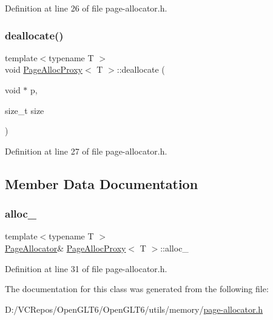 Definition at line 26 of file page-\/allocator.\+h.

\mbox{\label{class_page_alloc_proxy_aae141951053a3d3a4288b9a8cd548514}} 
\subsubsection{\texorpdfstring{deallocate()}{deallocate()}}
{\footnotesize\ttfamily template$<$typename T $>$ \\
void \mbox{\hyperlink{class_page_alloc_proxy}{Page\+Alloc\+Proxy}}$<$ T $>$\+::deallocate (\begin{DoxyParamCaption}\item[{void $\ast$}]{p,  }\item[{size\+\_\+t}]{size }\end{DoxyParamCaption})\hspace{0.3cm}{\ttfamily [inline]}}



Definition at line 27 of file page-\/allocator.\+h.



\subsection{Member Data Documentation}
\mbox{\label{class_page_alloc_proxy_a7b5be1918abad6ffc2cc6f88b1dec98c}} 
\subsubsection{\texorpdfstring{alloc\_}{alloc\_}}
{\footnotesize\ttfamily template$<$typename T $>$ \\
\mbox{\hyperlink{class_page_allocator}{Page\+Allocator}}\& \mbox{\hyperlink{class_page_alloc_proxy}{Page\+Alloc\+Proxy}}$<$ T $>$\+::alloc\+\_\+}



Definition at line 31 of file page-\/allocator.\+h.



The documentation for this class was generated from the following file\+:\begin{DoxyCompactItemize}
\item 
D\+:/\+V\+C\+Repos/\+Open\+G\+L\+T6/\+Open\+G\+L\+T6/utils/memory/\mbox{\hyperlink{page-allocator_8h}{page-\/allocator.\+h}}\end{DoxyCompactItemize}
